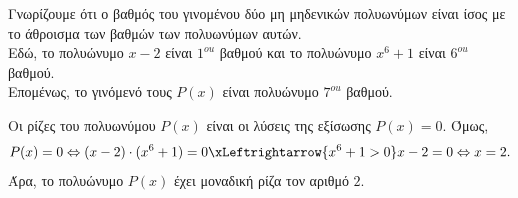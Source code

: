 \begin{alist}
\item Γνωρίζουμε ότι ο βαθμός του γινομένου δύο μη μηδενικών πολυωνύμων είναι ίσος με το άθροισμα των βαθμών των πολυωνύμων αυτών. \\
Εδώ, το πολυώνυμο $x - 2$ είναι $1^{ou}$ βαθμού και το πολυώνυμο $x^6 + 1$ είναι $6^{ou}$ βαθμού. \\
Επομένως, το γινόμενό τους $P(x)$ είναι πολυώνυμο $7^{ou}$ βαθμού.
\item Οι ρίζες του πολυωνύμου $P(x)$ είναι οι λύσεις της εξίσωσης $P(x) = 0$. Όμως,
\[P(x) = 0 \Leftrightarrow (x - 2) \cdot (x^6 + 1) = 0 \xLeftrightarrow{x^6 + 1 > 0} x - 2 = 0 \Leftrightarrow x = 2.\]
Άρα, το πολυώνυμο $P(x)$ έχει μοναδική ρίζα τον αριθμό $2$.
\end{alist}


